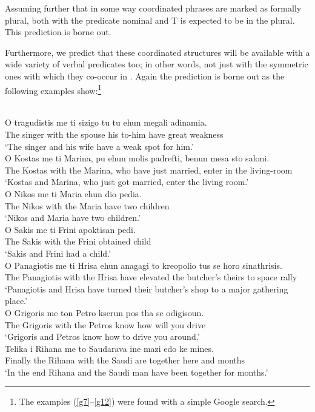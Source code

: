 \documentclass[output=paper]{langsci/langscibook}
\begin{document}
Assuming further that in some way coordinated phrases are marked as formally
plural,  both with the predicate nominal and T is expected to be
in the plural. This prediction is borne out.

Furthermore, we predict that these coordinated structures will be available
with a wide variety of verbal predicates too; in other words, not just with the
symmetric ones with which they co-occur in . Again the prediction
is borne out as the following examples show:\footnote{The examples
(\ref{g7}--\ref{g12}) were found with a simple Google search.}

\ea\label{ex:29.33} \\
	\gll    O tragudistis me ti sizigo tu tu ehun megali adinamia.\\
            The singer with the spouse his to-him have great weakness\\ \label{g7}
    \glt    \enquote*{The singer and his wife have a weak spot for him.}
\ex\label{ex:29.34} \\
	\gll    O Kostas me ti Marina, pu ehun molis padrefti, benun mesa sto
    saloni.\\
            The Kostas with the Marina, who have just married, enter in the living-room\\ \label{g8}
    \glt    \enquote*{Kostas and Marina, who just got married, enter the living
    room.}
\ex\label{ex:29.35} \\
	\gll    O Nikos me ti Maria ehun dio pedia.\\
            The Nikos with the Maria have two children\\ \label{g9}
    \glt    \enquote*{Nikos and Maria have two children.}
\ex\label{ex:29.36} \\
	\gll    O Sakis me ti Frini apoktisan pedi.\\
            The Sakis with the Frini obtained child\\ \label{g10}
    \glt    \enquote*{Sakis and Frini had a child.}
\ex\label{ex:29.37} \\
	\gll    O Panagiotis me ti Hrisa ehun anagagi to kreopolio tus se horo
    sinathrisis.\\
            The Panagiotis with the Hrisa have elevated the butcher's theirs to space rally\\ \label{g11}
    \glt    \enquote*{Panagiotis and Hrisa have turned their butcher's shop to
    a major gathering place.}
\ex\label{ex:29.38} \\
	\gll    O Grigoris me ton Petro kserun pos tha se odigisoun.\\
            The Grigoris with the Petros know how will you drive\\ \label{g12}
    \glt    \enquote*{Grigoris and Petros know how to drive you around.}
\ex\label{ex:29.39} \\
	\gll    Telika i Rihana me to Saudarava ine mazi edo ke mines.\\
            Finally the Rihana with the Saudi are together here and months\\ \label{g13}
    \glt    \enquote*{In the end Rihana and the Saudi man have been together
    for months.}
\z
\end{document}
